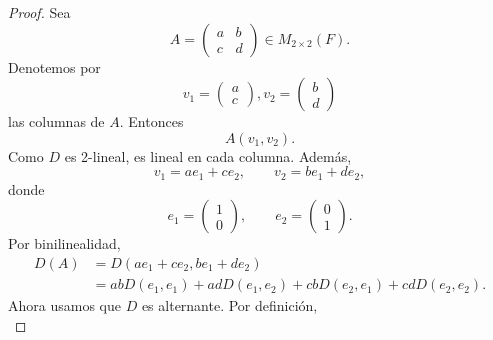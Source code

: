 \documentclass[12pt,a4paper]{article}
\begin{document}
    \begin{proof}
        Sea
        \begin{equation*}
            A=
            \begin{pmatrix}
                a & b\\
                c & d
            \end{pmatrix}
            \in M_{2\times 2}(F).
        \end{equation*}
        Denotemos por
        \begin{equation*}
            v_{1}=
            \begin{pmatrix}
                a\\
                c
            \end{pmatrix},
            v_{2}=
            \begin{pmatrix}
                b\\
                d
            \end{pmatrix}
        \end{equation*}
        las columnas de $A$. Entonces
        \begin{equation*}
            A(v_{1},v_{2}).
        \end{equation*}
        Como $D$ es 2-lineal, es lineal en cada columna. Además,
        \begin{equation*}
            v_{1}=ae_{1}+ce_{2},\qquad v_{2}=be_{1}+de_{2},
        \end{equation*}
        donde
        \begin{equation*}
            e_{1}=
            \begin{pmatrix}
                1\\
                0
            \end{pmatrix},
            \qquad
            e_{2}=
            \begin{pmatrix}
                0\\
                1
            \end{pmatrix}.
        \end{equation*}
        Por binilinealidad,
        \begin{align*}
            D(A)&=D(ae_{1}+ce_{2},be_{1}+de_{2})\\
            &=abD(e_{1},e_{1})+adD(e_{1},e_{2})+cbD(e_{2},e_{1})+cdD(e_{2},e_{2}).
        \end{align*}
        Ahora usamos que $D$ es alternante. Por definición,
        \begin{equation*}

\end{equation*}
\end{proof}
\end{document}
